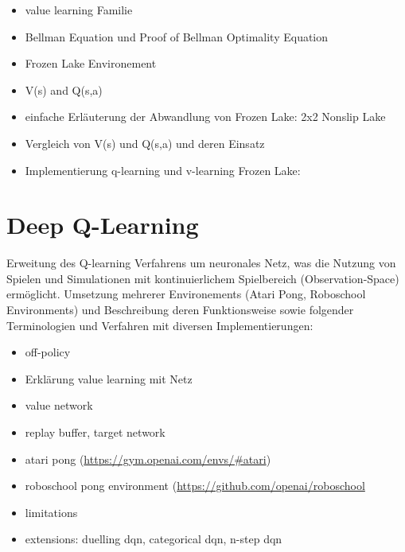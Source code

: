 \documentclass[11pt]{scrartcl}
\begin{document}
\begin{itemize}
\itemsep0pt
\item value learning Familie
\item Bellman Equation und Proof of Bellman Optimality Equation 
\item Frozen Lake Environement
\item V(s) and Q(s,a)
\item einfache Erläuterung der Abwandlung von Frozen Lake: 2x2 Nonslip Lake
\item Vergleich von V(s) und Q(s,a) und deren Einsatz
\item Implementierung q-learning und v-learning Frozen Lake:
\end{itemize}

\section{Deep Q-Learning}
Erweitung des Q-learning Verfahrens um neuronales Netz, was die Nutzung von Spielen und
Simulationen mit kontinuierlichem Spielbereich (Observation-Space) ermöglicht. Umsetzung
mehrerer Environements (Atari Pong, Roboschool Environments) und Beschreibung deren
Funktionsweise sowie folgender Terminologien und Verfahren mit diversen Implementierungen:

\begin{itemize}
\itemsep0pt
\item off-policy
\item Erklärung value learning mit Netz
\item value network
\item replay buffer, target network
\item atari pong (\url{https://gym.openai.com/envs/#atari})
\item roboschool pong environment (\url{https://github.com/openai/roboschool}
\item limitations
\item extensions: duelling dqn, categorical dqn, n-step dqn
\end{itemize}
\end{document}
